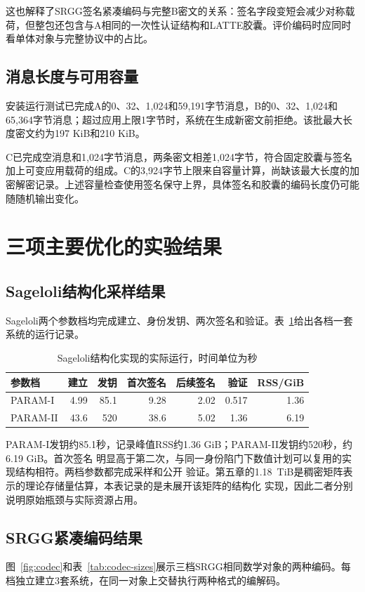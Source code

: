 这也解释了SRGG签名紧凑编码与完整B密文的关系：签名字段变短会减少对称载荷，但整包还包含与A相同的一次性认证结构和LATTE胶囊。评价编码时应同时看单体对象与完整协议中的占比。

\subsection{消息长度与可用容量}
安装运行测试已完成A的0、32、1,024和59,191字节消息，B的0、32、1,024和65,364字节消息；超过应用上限1字节时，系统在生成新密文前拒绝。该批最大长度密文约为197 KiB和210 KiB。

C已完成空消息和1,024字节消息，两条密文相差1,024字节，符合固定胶囊与签名加上可变应用载荷的组成。C的3,924字节上限来自容量计算，尚缺该最大长度的加密解密记录。上述容量检查使用签名保守上界，具体签名和胶囊的编码长度仍可能随随机输出变化。

\section{三项主要优化的实验结果}
\subsection{Sageloli结构化采样结果}
Sageloli两个参数档均完成建立、身份发钥、两次签名和验证。表~\ref{tab:sageloli-times}给出各档一套系统的运行记录。

\begin{table}[H]
\centering\small
\caption{Sageloli结构化实现的实际运行，时间单位为秒}
\label{tab:sageloli-times}
\begin{tabular}{@{}lrrrrrr@{}}
\toprule
\rowcolor{black!8} 参数档 & 建立 & 发钥 & 首次签名 & 后续签名 & 验证 & RSS/GiB \\
\midrule
PARAM-I & 4.99 & 85.1 & 9.28 & 2.02 & 0.517 & 1.36 \\
PARAM-II & 43.6 & 520 & 38.6 & 5.02 & 1.36 & 6.19 \\
\bottomrule
\end{tabular}
\end{table}

PARAM-I发钥约85.1秒，记录峰值RSS约1.36 GiB；PARAM-II发钥约520秒，约6.19 GiB。首次签名
明显高于第二次，与同一身份陷门下数值计划可以复用的实现结构相符。两档参数都完成采样和公开
验证。第五章的1.18~TiB是稠密矩阵表示的理论存储量估算，本表记录的是未展开该矩阵的结构化
实现，因此二者分别说明原始瓶颈与实际资源占用。

\Needspace{.45\textheight}
\subsection{SRGG紧凑编码结果}
图~\ref{fig:codec}和表~\ref{tab:codec-sizes}展示三档SRGG相同数学对象的两种编码。每档独立建立3套系统，在同一对象上交替执行两种格式的编解码。

